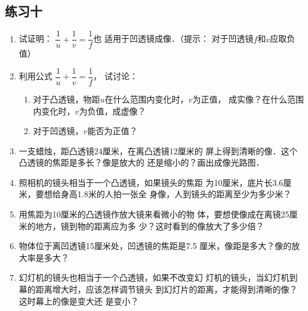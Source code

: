 \subsection{练习十}

\begin{enumerate}
    \item 试证明：
$\dfrac{1}{u}+\dfrac{1}{v}=\dfrac{1}{f}$也
适用于凹透镜成像．（提示：
对于凹透镜$f$和$v$应取负值）

\begin{solution}

\end{solution}
\item  利用公式
$\dfrac{1}{u}+\dfrac{1}{v}=\dfrac{1}{f}$，
试讨论：
\begin{enumerate}
    \item 对于凸透镜，物距$u$在什么范围内变化时，$v$为正值，
    成实像？在什么范围内变化时，$v$为负值，成虚像？
    \item 对于凹透镜，$v$能否为正值？
\end{enumerate}

\begin{solution}

\end{solution}
\item 一支蜡烛，距凸透镜24厘米，在离凸透镜12厘米的
屏上得到清晰的像．这个凸透镜的焦距是多长？像是放大的
还是缩小的？画出成像光路图．

\begin{solution}

\end{solution}
\item 照相机的镜头相当于一个凸透镜，如果镜头的焦距
为10厘米，底片长3.6厘米，要想给身高1.8米的人拍一张全
身像，人到镜头的距离至少为多少米？

\begin{solution}

\end{solution}
\item 用焦距为10厘米的凸透镜作放大镜来看微小的物
体，要想使像成在离镜25厘米的地方，镜到物的距离应为多
少？这时看到的像放大了多少倍？

\begin{solution}

\end{solution}
\item 物体位于离凹透镜15厘米处，凹透镜的焦距是7.5
厘米，像距是多大？像的放大率是多大？

\begin{solution}

\end{solution}
\item 幻灯机的镜头也相当于一个凸透镜，如果不改变幻
灯机的镜头，当幻灯机到幕的距离增大时，应该怎样调节镜头
到幻灯片的距离，才能得到清晰的像？这时幕上的像是变大还
是变小？

\begin{solution}

\end{solution}
\end{enumerate}





